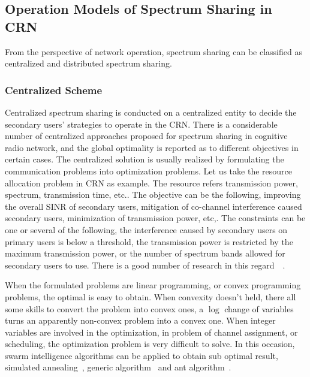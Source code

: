\subsection{Operation Models of Spectrum Sharing in CRN}
\label{operation_model}
From the perspective of network operation, spectrum sharing can be classified as centralized and distributed spectrum sharing.


\subsubsection{Centralized Scheme}
Centralized spectrum sharing is conducted on a centralized entity to decide the secondary users' strategies to operate in the CRN.
There is a considerable number of centralized approaches proposed for spectrum sharing in cognitive radio network, and the global optimality is reported as to different objectives in certain cases.
%
The centralized solution is usually realized by formulating the communication problems into optimization problems.
Let us take the resource allocation problem in CRN as example.
The resource refers transmission power, spectrum, transmission time, etc..
The objective can be the following, improving the overall SINR of secondary users, mitigation of co-channel interference caused secondary users, minimization of transmission power, etc,.
The constraints can be one or several of the following, the interference caused by secondary users on primary users is below a threshold, the transmission power is restricted by the maximum transmission power, or the number of spectrum bands allowed for secondary users to use.
There is a good number of research in this regard~\cite{resource_allocation_crn_Ahmad_2015}~\cite[Chapter~6]{Han:2008:RAW:1457343}.

When the formulated problems are linear programming, or convex programming problems, the optimal is easy to obtain.
When convexity doesn't held, there all some skills to convert the problem into convex ones, \eg a $\log$ change of variables turns an apparently non-convex problem into a convex one.
When integer variables are involved in the optimization, \eg in problem of channel assignment, or scheduling, the optimization problem is very difficult to solve.
In this occasion, swarm intelligence algorithms can be applied to obtain sub optimal result, \ie simulated annealing~\cite{simulated_annealing_09, Tang20122690}, generic algorithm~\cite{Chen_2010} and ant algorithm~\cite{he_2012}.


